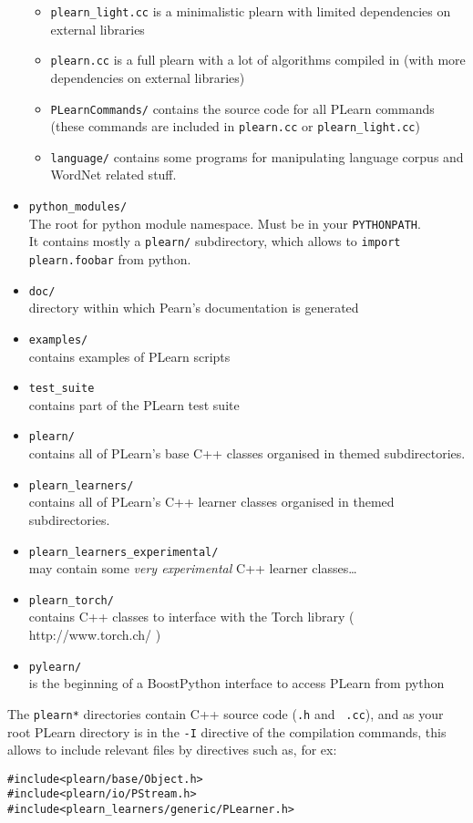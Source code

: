 \documentclass[11pt]{book}
\begin{document}
\begin{itemize}
\begin{itemize}
  \item \verb!plearn_light.cc! is a minimalistic plearn with limited dependencies
    on external libraries
  \item \verb!plearn.cc! is a full plearn with a lot of algorithms
    compiled in (with more dependencies on external libraries)
  \item \verb!PLearnCommands/! contains the source code for all PLearn
    commands (these commands are included in \verb!plearn.cc! or \verb!plearn_light.cc!)
  \item \verb!language/! contains some programs for manipulating language
    corpus and WordNet related stuff.
  \end{itemize}
\item \verb!python_modules/! \\
The root for python module namespace. Must be in your \verb!PYTHONPATH!. \\
It contains mostly a \verb!plearn/! subdirectory, which allows to \verb!import plearn.foobar! from python.
\item \verb!doc/! \\
directory within which Pearn's documentation is generated
\item \verb!examples/! \\
contains examples of PLearn scripts 
\item \verb!test_suite! \\
contains part of the PLearn test suite
\item \verb!plearn/! \\
contains all of PLearn's base C++ classes organised in themed subdirectories.
\item \verb!plearn_learners/! \\
contains all of PLearn's C++ learner classes organised in themed subdirectories.
\item \verb!plearn_learners_experimental/! \\
may contain some {\em very experimental} C++ learner classes\ldots
\item \verb!plearn_torch/! \\
contains C++ classes to interface with the Torch library ( http://www.torch.ch/ )
\item \verb!pylearn/! \\
is the beginning of a BoostPython interface to access PLearn from python
\end{itemize}

The \verb!plearn*! directories contain C++ source code ({\tt .h} and {\tt
  .cc}), and as your root PLearn directory is in the \verb!-I! directive of
the compilation commands, this allows to include relevant files by
directives such as, for ex:
\begin{verbatim}
#include<plearn/base/Object.h>
#include<plearn/io/PStream.h>
#include<plearn_learners/generic/PLearner.h>
\end{verbatim}
\end{document}
